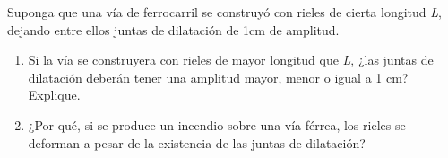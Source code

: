 
Suponga que una vía de ferrocarril se construyó con rieles de cierta longitud \textit{L}, dejando entre ellos juntas de dilatación de 1cm de amplitud.
\begin{enumerate}
    \item Si la vía se construyera con rieles de mayor longitud que \textit{L}, ¿las juntas de dilatación deberán tener una amplitud mayor, menor o igual a 1 cm? Explique.
    \item ¿Por qué, si se produce un incendio sobre una vía férrea, los rieles se deforman a pesar de la existencia de las juntas de dilatación?
\end{enumerate}